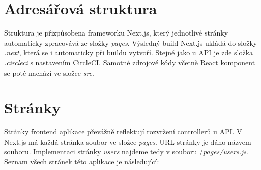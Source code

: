 \documentclass[thesis=M,czech]{FITthesis}[2018/10/20]
\begin{document}
\section{Adresářová struktura}
Struktura je přizpůsobena frameworku Next.js, který jednotlivé stránky automaticky zpracovává ze složky \textit{pages}. Výsledný build Next.js ukládá do složky \textit{.next}, která se i automaticky při buildu vytvoří. Stejně jako u API je zde složka \textit{.circleci} s nastavením CircleCI. Samotné zdrojové kódy včetně React komponent se poté nachází ve složce \textit{src}.
\bigbreak
\begin{figure}[H]
\end{figure}
\newpage
\section{Stránky}
Stránky frontend aplikace převážně reflektují rozvržení controllerů u API. V Next.js má každá stránka soubor ve složce \textit{pages}. URL stránky je dáno názvem souboru. Implementaci stránky \textit{users} najdeme tedy v souboru /\textit{pages/users.js}. Seznam všech stránek této aplikace je následující:
\end{document}
